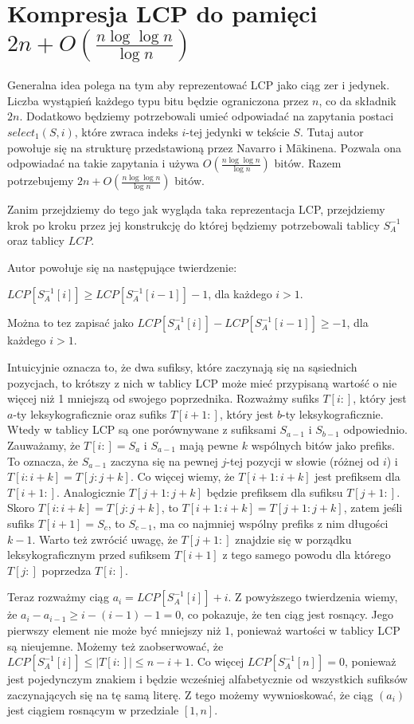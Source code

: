 \documentclass{article}
\begin{document}
\section{Kompresja LCP do pamięci $2n + O(\frac{n \log\log{n}}{\log{n}})$}

Generalna idea polega na tym aby reprezentować LCP jako ciąg zer i jedynek. Liczba wystąpień każdego typu bitu będzie ograniczona przez $n$, co da składnik $2n$. Dodatkowo będziemy potrzebowali umieć odpowiadać na zapytania postaci $select_1(S, i)$, które zwraca indeks $i$-tej jedynki w tekście $S$. Tutaj autor powołuje się na strukturę przedstawioną przez Navarro i M\"akinena. Pozwala ona odpowiadać na takie zapytania i używa $O(\frac{n \log\log{n}}{\log{n}})$ bitów. Razem potrzebujemy $2n +  O(\frac{n \log\log{n}}{\log{n}})$ bitów.

Zanim przejdziemy do tego jak wygląda taka reprezentacja LCP, przejdziemy krok po kroku przez jej konstrukcję do której będziemy potrzebowali tablicy $S_A^{-1}$ oraz tablicy $LCP$. 

Autor powołuje się na następujące twierdzenie:

$LCP[S_A^{-1}[i]] \ge LCP[S_A^{-1}[i - 1]] - 1$, dla każdego $ i > 1$.

Można to tez zapisać jako $LCP[S_A^{-1}[i]] - LCP[S_A^{-1}[i - 1]] \ge - 1$, dla każdego $ i > 1$.

Intuicyjnie oznacza to, że dwa sufiksy, które zaczynają się na sąsiednich pozycjach, to krótszy z nich w tablicy LCP może mieć przypisaną wartość o nie więcej niż 1 mniejszą od swojego poprzednika. Rozważmy sufiks $T[i:]$, który jest $a$-ty leksykograficznie oraz sufiks $T[i+1:]$, który jest $b$-ty leksykograficznie. Wtedy w tablicy LCP są one porównywane z sufiksami $S_{a-1}$ i $S_{b-1}$ odpowiednio. Zauważamy, że $T[i:] = S_a$ i $S_{a-1}$ mają pewne $k$ wspólnych bitów jako prefiks. To oznacza, że $S_{a-1}$ zaczyna się na pewnej $j$-tej pozycji w słowie (różnej od $i$) i $T[i:i+k] = T[j:j+k]$. Co więcej wiemy, że $T[i+1:i+k]$ jest prefiksem dla $T[i+1:]$. Analogicznie $T[j+1:j+k]$ będzie prefiksem dla sufiksu $T[j+1:]$. Skoro $T[i:i+k] = T[j:j+k]$, to $T[i+1:i+k] = T[j+1: j+k]$, zatem jeśli sufiks $T[i+1] = S_c$, to $S_{c-1}$, ma co najmniej wspólny prefiks z nim długości $k-1$. Warto też zwrócić uwagę, że $T[j+1:]$ znajdzie się w porządku leksykograficznym przed sufiksem $T[i+1]$ z tego samego powodu dla którego $T[j:]$ poprzedza $T[i:]$.

Teraz rozważmy ciąg $a_i = LCP[S_A^{-1}[i]] + i$. Z powyższego twierdzenia wiemy, że $a_i - a_{i-1} \ge i - (i-1) - 1 = 0$, co pokazuje, że ten ciąg jest rosnący. Jego pierwszy element nie może być mniejszy niż $1$, ponieważ wartości w tablicy LCP są nieujemne. Możemy też zaobserwować, że $LCP[S_A^{-1}[i]] \le |T[i:]| \le n-i+1$. Co więcej $LCP[S_A^{-1}[n]] = 0$, ponieważ jest pojedynczym znakiem i będzie wcześniej alfabetycznie od wszystkich sufiksów zaczynających się na tę samą literę. Z tego możemy wywnioskować, że ciąg $(a_i)$ jest ciągiem rosnącym w przedziale $[1,n]$.
\end{document}
